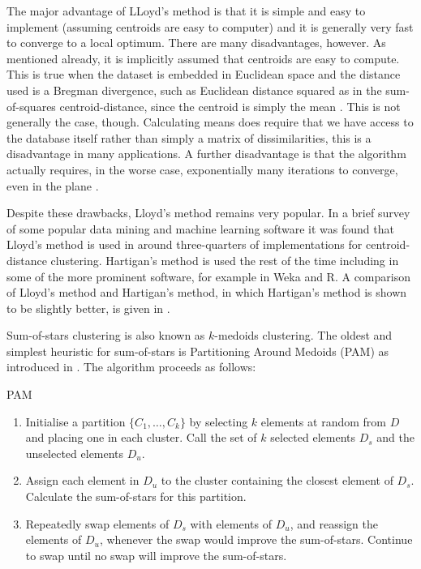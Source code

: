 \documentclass[a4paper]{report}
\newcommand{\dset}{D}
\begin{document}
The major advantage of LLoyd's method is that it is simple and easy to
implement (assuming centroids are easy to computer) and it is generally very
fast to converge to a local optimum.  There are many disadvantages, however.
As mentioned already, it is implicitly assumed that centroids are easy to
compute.  This is true when the dataset is embedded in Euclidean space and the
distance used is a Bregman divergence, such as Euclidean distance squared as
in the sum-of-squares centroid-distance, since the centroid is simply the mean
\citep{telgarsky2010hartigan,banerjee2005clustering}.  This is not generally
the case, though.  Calculating means does require that we have access to the
database itself rather than simply a matrix of dissimilarities, this is a
disadvantage in many applications.  A further disadvantage is that the
algorithm actually requires, in the worse case, exponentially many iterations
to converge, even in the plane \citep{vattani2009exponential}.

Despite these drawbacks, Lloyd's method remains very popular.  In a brief
survey of some popular data mining and machine learning software it was found
that Lloyd's method is used in around three-quarters of implementations for
centroid-distance clustering.  Hartigan's method is used the rest of the time
including in some of the more prominent software, for example in Weka and R.
A comparison of Lloyd's method and Hartigan's method, in which Hartigan's
method is shown to be slightly better, is given in
\citep{telgarsky2010hartigan}.

Sum-of-stars clustering is also known as $k$-medoids clustering.  The oldest
and simplest heuristic for sum-of-stars is Partitioning Around Medoids (PAM)
as introduced in \citet{kaufman2005finding}.  The algorithm proceeds as
follows:
\begin{algorithm}
  \caption{PAM}
  \begin{enumerate}
  \item Initialise a partition $\{C_1,\dotsc,C_k\}$ by selecting $k$ elements
    at random from $\dset$ and placing one in each cluster.  Call the set of
    $k$ selected elements $\dset_s$ and the unselected elements $\dset_u$.
  \item Assign each element in $\dset_u$ to the cluster containing the closest
    element of $\dset_s$.  Calculate the sum-of-stars for this partition.
  \item Repeatedly swap elements of $\dset_s$ with elements of $\dset_u$, and
    reassign the elements of $\dset_u$, whenever the swap would improve the
    sum-of-stars.  Continue to swap until no swap will improve the
    sum-of-stars.
  \end{enumerate}
\end{algorithm}
\end{document}
